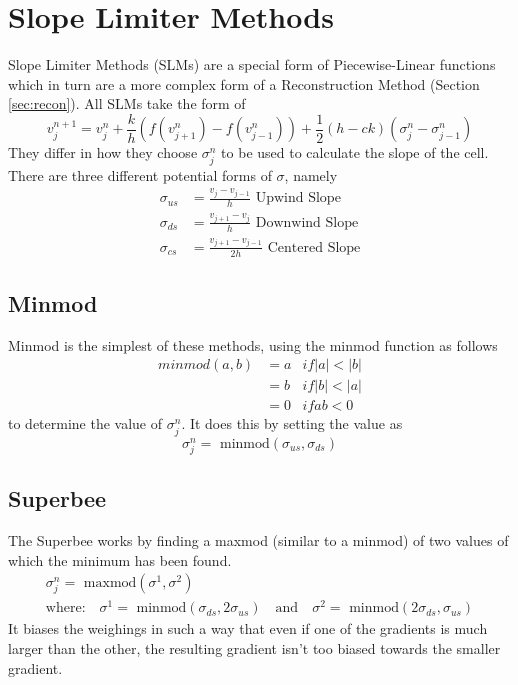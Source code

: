 \section{Slope Limiter Methods}
Slope Limiter Methods (SLMs) are a special form of Piecewise-Linear functions which in turn are a more complex form of a Reconstruction Method (Section \ref{sec:recon}). All SLMs take the form of
\begin{equation}\label{eq:slm}
  v^{n+1}_j = v^n_j + \frac{k}{h}(f(v^n_{j+1}) - f(v^n_{j-1})) + \frac{1}{2}(h-ck)(\sigma^n_j - \sigma^n_{j-1})
\end{equation}
They differ in how they choose $\sigma^n_j$ to be used to calculate the slope of the cell. There are three different potential forms of $\sigma$, namely
\begin{align*}
  \sigma_{us} &= \frac{v_j     - v_{j-1}}{h} \text{ Upwind Slope}  \\
  \sigma_{ds} &= \frac{v_{j+1} - v_j}{h} \text{ Downwind Slope} \\
  \sigma_{cs} &= \frac{v_{j+1} - v_{j-1}}{2h} \text{ Centered Slope}
\end{align*}
\subsection{Minmod}
Minmod is the simplest of these methods, using the minmod function as follows
\begin{align*}
  minmod(a,b)   &= a &if |a| < |b|\\
                &= b &if |b| < |a|\\
                &= 0 &if ab < 0
\end{align*}
to determine the value of $\sigma^n_j$. It does this by setting the value as
\begin{equation*}
  \sigma^n_j = \text{ minmod}(\sigma_{us},\sigma_{ds})
\end{equation*}
\subsection{Superbee}
The Superbee works by finding a maxmod (similar to a minmod) of two values of which the minimum has been found.
\begin{gather*}
  \sigma^n_j = \text{ maxmod}(\sigma^1,\sigma^2) \\
  \text{where:} \quad \sigma^1 = \text{ minmod}(\sigma_{ds},2\sigma_{us}) \quad \text{and} \quad \sigma^2 = \text{ minmod}(2\sigma_{ds},\sigma_{us})
\end{gather*}
It biases the weighings in such a way that even if one of the gradients is much larger than the other, the resulting gradient isn't too biased towards the smaller gradient.
